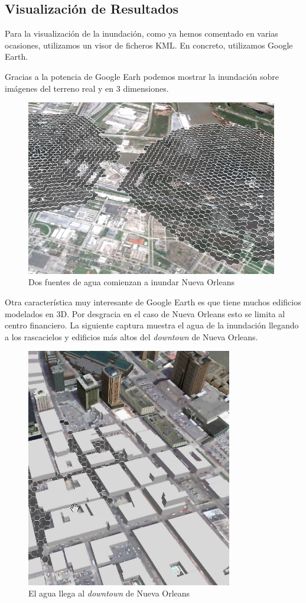 \subsection{Visualización de Resultados}

Para la visualización de la inundación, como ya hemos comentado en varias
ocasiones, utilizamos un visor de ficheros KML. En concreto, utilizamos Google
Earth.

Gracias a la potencia de Google Earh podemos mostrar la inundación sobre
imágenes del terreno real y en 3 dimensiones.

\begin{figure}[H]
 \centering
 \includegraphics[width=110mm]{figuras/cap6/resultados/ejemplo.png}
 \caption{Dos fuentes de agua comienzan a inundar Nueva Orleans}
\end{figure}

Otra característica muy interesante de Google Earth es que tiene muchos
edificios modelados en 3D. Por desgracia en el caso de Nueva Orleans esto se
limita al centro financiero. La siguiente captura muestra el agua de la
inundación llegando a los rascacielos y edificios más altos del {\em downtown}
de Nueva Orleans.

\begin{figure}[H]
 \centering
 \includegraphics[width=90mm]{figuras/cap6/resultados/3D.png}
 \caption{El agua llega al {\em downtown} de Nueva Orleans}
\end{figure}

